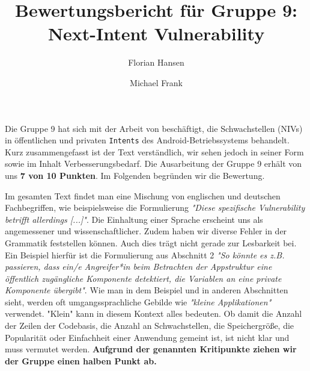 \documentclass{article}
\author{Florian Hansen \and Michael Frank}
\title{Bewertungsbericht für Gruppe 9: Next-Intent Vulnerability}
\begin{document}
  \maketitle

  Die Gruppe 9 hat sich mit der Arbeit von \cite{niv} beschäftigt, die
  Schwachstellen (NIVs) in öffentlichen und privaten \texttt{Intents} des
  Android-Betriebssystems behandelt. Kurz zusammengefasst ist der Text
  verständlich, wir sehen jedoch in seiner Form sowie im Inhalt
  Verbesserungsbedarf. Die Ausarbeitung der Gruppe 9 erhält von uns 
  \textbf{7 von 10 Punkten}. Im Folgenden begründen wir die Bewertung.

  Im gesamten Text findet man eine Mischung von englischen und deutschen
  Fachbegriffen, wie beispielsweise die Formulierung \textit{"Diese spezifische
  Vulnerability betrifft allerdings [...]"}. Die Einhaltung einer Sprache
  erscheint uns als angemessener und wissenschaftlicher. Zudem haben wir
  diverse Fehler in der Grammatik feststellen können. Auch dies trägt nicht
  gerade zur Lesbarkeit bei. Ein Beispiel hierfür ist die Formulierung aus
  Abschnitt 2 \textit{"So könnte es z.B. passieren, dass ein/e Angreifer*in beim
  Betrachten der Appstruktur eine öffentlich zugängliche Komponente
  detektiert, die Variablen an eine private Komponente übergibt"}. Wie man in
  dem Beispiel und in anderen Abschnitten sieht, werden oft umgangssprachliche
  Gebilde wie \textit{"kleine Applikationen"} verwendet. "Klein" kann in
  diesem Kontext alles bedeuten. Ob damit die Anzahl der Zeilen der Codebasis,
  die Anzahl an Schwachstellen, die Speichergröße, die Popularität oder
  Einfachheit einer Anwendung gemeint ist, ist nicht klar und muss vermutet
  werden. \textbf{Aufgrund der genannten Kritipunkte ziehen wir der Gruppe einen 
halben Punkt ab.}
\end{document}
